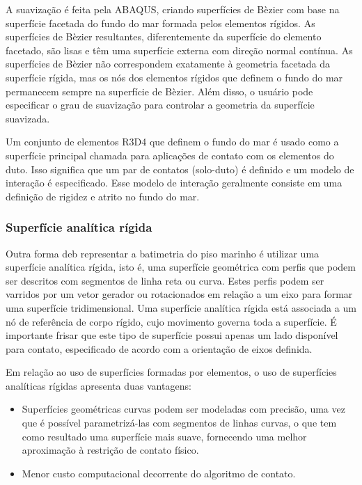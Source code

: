 A suavização é feita pela ABAQUS, criando superfícies de Bèzier com base na superfície facetada do fundo do mar formada pelos elementos rígidos. As superfícies de Bèzier resultantes, diferentemente da superfície do elemento facetado, são lisas e têm uma superfície externa com direção normal contínua. As superfícies de Bèzier não correspondem exatamente à geometria facetada da superfície rígida, mas os nós dos elementos rígidos que definem o fundo do mar permanecem sempre na superfície de Bèzier. Além disso, o usuário pode especificar o grau de suavização para controlar a geometria da superfície suavizada.

Um conjunto de elementos R3D4 que definem o fundo do mar é usado como a superfície principal chamada para aplicações de contato com os elementos do duto. Isso significa que um par de contatos (solo-duto) é definido e um modelo de interação é especificado. Esse modelo de interação geralmente consiste em uma definição de rigidez e atrito no fundo do mar.


\subsubsection{Superfície analítica rígida}

Outra forma deb representar a batimetria do piso marinho é utilizar uma superfície analítica rígida, isto é, uma superfície geométrica com perfis que podem ser descritos com segmentos de linha reta ou curva. Estes perfis podem ser varridos por um vetor gerador ou rotacionados em relação a um eixo para formar uma superfície tridimensional. Uma superfície analítica rígida está associada a um nó de referência de corpo rígido, cujo movimento governa toda a superfície. É importante frisar que este tipo de superfície possui apenas um lado disponível para contato, especificado de acordo com a orientação de eixos definida.

Em relação ao uso de superfícies formadas por elementos, o uso de superfícies analíticas rígidas apresenta duas vantagens:
\begin{itemize}
    \item Superfícies geométricas curvas podem ser modeladas com precisão, uma vez que é possível parametrizá-las com segmentos de linhas curvas, o que tem como resultado uma superfície mais suave, fornecendo uma melhor aproximação à restrição de contato físico.
    \item Menor custo computacional decorrente do algoritmo de contato.
\end{itemize}

